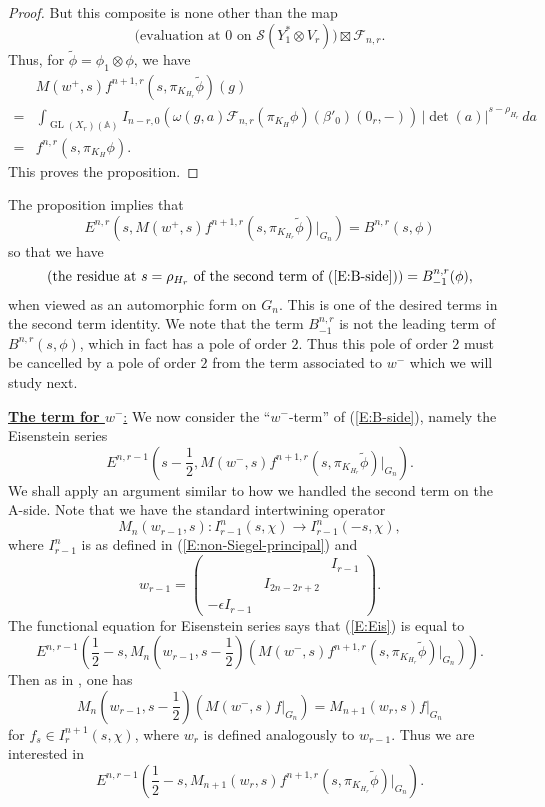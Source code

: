 \documentclass[10pt]{amsart}
\theoremstyle{plain}
\numberwithin{equation}{section}
\begin{document}
\begin{proof}
\noindent  But this composite is none other than the map
\[  \text{(evaluation at $0$ on $\mathcal{S}(Y_1^* \otimes V_r)$)}
\boxtimes \mathcal{F}_{n,r}. \]
Thus, for $\tilde{\phi} = \phi_1 \otimes \phi$, we have
\begin{align*} 
& M(w^+,s) f^{n+1,r}(s, \pi_{K_{H_r}} \tilde{\phi}) (g)\\
=&\int_{{\operatorname{GL}}(X_r)({\mathbb{A}})}  I_{n-r,0}\left(\omega(g,a)
  \mathcal{F}_{n,r}(\pi_{K_H} \phi)( \beta'_0)(0_r,-)\right) \,
|\det(a)|^{s - \rho_{H_r}} \, da\\
=&  f^{n,r}(s, \pi_{K_H} \phi).
\end{align*}
This proves the proposition.
\end{proof}
 
 The proposition implies that 
 \[ E^{n,r} ( s,  M(w^+,s) f^{n+1,r}(s, \pi_{K_{H_r}} \tilde{\phi})|_{G_{n}} ) = B^{n,r}(s, \phi) \]
 so that we have
\begin{equation}\label{E:B-side-fin1}
\left(\text{the residue at $s= \rho_{H_r}$ of the second term of (\ref{E:B-side})}\right)
=B^{n,r}_{-1}(\phi),
\end{equation}
when viewed as an automorphic form on $G_n$. This is one of the
desired terms in the second term identity. We note that the term
$B^{n,r}_{-1}$ is not the leading term of $B^{n,r}(s, \phi)$, which in
fact has a pole of order $2$.  Thus this pole of order $2$ must be
cancelled by a pole of order $2$ from the term associated
to $w^-$ which we will study next. 
\vskip 10pt
 
\noindent\underline{{\bf The term for $w^-$}:}
We now consider the ``$w^-$-term'' of (\ref{E:B-side}), namely the Eisenstein series
\begin{equation} \label{E:Eis}
E^{n,r-1}(s - \frac{1}{2},  M(w^-,s) f^{n+1,r}(s, \pi_{K_{H_r}}
\tilde{\phi})|_{G_{n}}).  
\end{equation}
 We shall apply an argument similar to how we handled the second term on the A-side. 
 Note that we have the standard intertwining operator 
 \[  M_n(w_{r-1}, s):  I^n_{r-1}(s,\chi) \longrightarrow
 I^n_{r-1}(-s,\chi),\]
where $I_{r-1}^n$ is as defined in (\ref{E:non-Siegel-principal}) and
\[
w_{r-1}=
\begin{pmatrix}&&I_{r-1}\\ & I_{2n-2r+2}&\\-\epsilon
  I_{r-1}&&\end{pmatrix}.
\]
 The functional equation for Eisenstein series says that (\ref{E:Eis})  is equal to
 \[  E^{n,r-1}\left(\frac{1}{2}-s, M_n(w_{r-1}, s-
 \frac{1}{2})\left(M(w^-,s) f^{n+1,r}(s, \pi_{K_{H_r}}
   \tilde{\phi})|_{G_{n}}\right)\right).  \]
 Then as in \cite[Lemma 1.2.2]{KR3}, one has 
 \[ M_n(w_{r-1}, s- \frac{1}{2})\left( M(w^-,s)f |_{G_n}\right)
  =  M_{n+1}(w_{r}, s) f|_{G_n} \]
  for $f_s \in I^{n+1}_r(s,\chi)$, where $w_r$ is defined analogously
  to $w_{r-1}$. Thus we are interested in 
  \begin{equation} \label{E:Eis2}
    E^{n,r-1}(\frac{1}{2}-s, M_{n+1}(w_{r}, s)  f^{n+1,r}(s,
    \pi_{K_{H_r}} \tilde{\phi})|_{G_{n}}).  
\end{equation}
  
\end{document}

